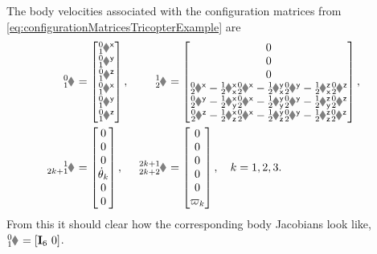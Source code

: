 \begin{Example}
The body velocities associated with the configuration matrices from \eqref{eq:configurationMatricesTricopterExample} are
\begin{subequations}
\begin{align}
 \bodyVel{0}{1} &= \begin{bmatrix} \bodyLinVelx{0}{1} \\ \bodyLinVely{0}{1} \\ \bodyLinVelz{0}{1} \\ \bodyAngVelx{0}{1} \\ \bodyAngVely{0}{1} \\ \bodyAngVelz{0}{1} \end{bmatrix},&
 \bodyVel{1}{2} &= 
 \begin{bmatrix}
  0 \\ 0 \\ 0 \\
  \bodyAngVelx{0}{2} - \bodyRotxx{1}{2} \bodyAngVelx{0}{2} - \bodyRotyx{1}{2} \bodyAngVely{0}{2} - \bodyRotzx{1}{2} \bodyAngVelz{0}{2} \\
  \bodyAngVely{0}{2} - \bodyRotxy{1}{2} \bodyAngVelx{0}{2} - \bodyRotyy{1}{2} \bodyAngVely{0}{2} - \bodyRotzy{1}{2} \bodyAngVelz{0}{2} \\
  \bodyAngVelz{0}{2} - \bodyRotxz{1}{2} \bodyAngVelx{0}{2} - \bodyRotyz{1}{2} \bodyAngVely{0}{2} - \bodyRotzz{1}{2} \bodyAngVelz{0}{2} 
 \end{bmatrix},&
\\
 \bodyVel{1}{2k+1} &= \begin{bmatrix} 0 \\ 0 \\ 0 \\ \aServod[k] \\ 0 \\ 0 \end{bmatrix},&
 \bodyVel{2k+1}{2k+2} &= \begin{bmatrix} 0 \\ 0 \\ 0 \\ 0 \\ 0 \\ \PropVel[k] \end{bmatrix},
\quad k=1,2,3.
\end{align}
\end{subequations}
From this it should clear how the corresponding body Jacobians look like, \eg $\bodyJac{0}{1} = [\idMat[6] \ 0]$.


\end{Example}
